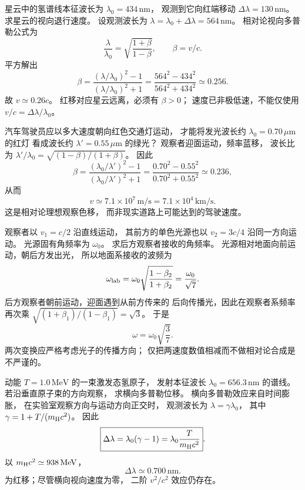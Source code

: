 星云中的氢谱线本征波长为
$\lambda_0=434\,\mathrm{nm}$，
观测到它向红端移动
$\Delta\lambda=130\,\mathrm{nm}$。
求星云的视向退行速度。
\exsolution
设观测波长为
$\lambda=\lambda_0+\Delta\lambda=564\,\mathrm{nm}$。
相对论视向多普勒公式为
\[
 \frac{\lambda}{\lambda_0}
 =\sqrt{\frac{1+\beta}{1-\beta}},
 \qquad \beta=v/c.
\]
平方解出
\[
 \boxed{\beta=
 \frac{(\lambda/\lambda_0)^2-1}
 {(\lambda/\lambda_0)^2+1}}
 =\frac{564^2-434^2}{564^2+434^2}
 \simeq0.256.
\]
故 $\boxed{v\simeq0.26c}$。
\excheck 红移对应星云远离，必须有 $\beta>0$；
速度已非极低速，不能仅使用 $v/c=\Delta\lambda/\lambda_0$。

汽车驾驶员应以多大速度朝向红色交通灯运动，
才能将发光波长约
$\lambda_0=0.70\,\mu\mathrm m$ 的红灯
看成波长约
$\lambda'=0.55\,\mu\mathrm m$ 的绿光？
\exsolution
观察者迎面运动，频率蓝移，
波长比为
$\lambda'/\lambda_0=\sqrt{(1-\beta)/(1+\beta)}$。
因此
\[
 \boxed{\beta=
 \frac{(\lambda_0/\lambda')^2-1}
 {(\lambda_0/\lambda')^2+1}
 =\frac{0.70^2-0.55^2}{0.70^2+0.55^2}
 \simeq0.236},
\]
从而
\[
 \boxed{v\simeq7.1\times10^7\,\mathrm{m/s}
 =7.1\times10^4\,\mathrm{km/s}}.
\]
\excheck 这是相对论理想观察色移，
而非现实道路上可能达到的驾驶速度。

观察者以 $v_1=c/2$ 沿直线运动，
其前方的单色光源也以
$v_2=3c/4$ 沿同一方向运动。
光源固有角频率为 $\omega_0$。
求后方观察者接收的角频率。
\exsolution
光源相对地面向前运动，朝后方发出光，
所以地面系接收的波频为
\[
 \omega_{\rm lab}=\omega_0
 \sqrt{\frac{1-\beta_2}{1+\beta_2}}
 =\frac{\omega_0}{\sqrt7}.
\]
后方观察者朝前运动，迎面遇到从前方传来的
后向传播光，因此在观察者系频率再次乘
$\sqrt{(1+\beta_1)/(1-\beta_1)}=\sqrt3$。
于是
\[
 \boxed{\omega=\omega_0\sqrt{\frac37}}.
\]
\excheck 两次变换应严格考虑光子的传播方向；
仅把两速度数值相减而不做相对论合成是不严谨的。

动能 $T=1.0\,\mathrm{MeV}$ 的一束激发态氢原子，
发射本征波长
$\lambda_0=656.3\,\mathrm{nm}$ 的谱线。
若沿垂直原子束的方向观察，
求横向多普勒位移。
\exsolution
横向多普勒效应来自时间膨胀，
在实验室观察方向与运动方向正交时，
观测波长为
$\lambda=\gamma\lambda_0$，
其中 $\gamma=1+T/(m_{\rm H}c^2)$。
因此
\[
 \boxed{\Delta\lambda=
 \lambda_0(\gamma-1)
 =\lambda_0\frac{T}{m_{\rm H}c^2}}.
\]
以 $m_{\rm H}c^2\simeq938\,\mathrm{MeV}$，
\[
 \boxed{\Delta\lambda\simeq0.700\,\mathrm{nm}}.
\]
\excheck 为红移；尽管横向视向速度为零，
二阶 $v^2/c^2$ 效应仍存在。

